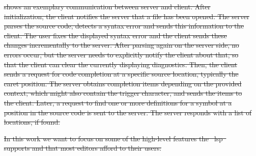\documentclass[sigplan,10pt,review,anonymous]{acmart}
\providecommand{\DIFdel}[1]{{\protect\color{red}\sout{#1}}}                      %
\begin{document}
\DIFdel{shows an exemplary communication between server and
client. After initialization, the client notifies the server that a file has
been opened. The server parses the source code, detects a syntax error and sends
this information to the client. The user fixes the displayed syntax error and
the client sends these changes incrementally to the server. After parsing again
on the server side, no errors occur, but the server needs to explicitly notify
the client about that, so that the client can clear the currently displaying
diagnostics. Then, the client sends a request for code completion at a specific
source location, typically the caret position. The server obtains completion
items depending on the provided context, which might also contain the trigger
character, and sends the items to the client. Later, a request to find one or
more definitions for a symbol at a position in the source code is sent to the
server. The server responds with a list of locations, if found.
}%


\DIFdel{In this work we want to focus on some of the high-level features the \mbox{%
\ac{lsp} }\hspace{0pt}%
supports and that most editors afford to their users:
}%
\end{document}
